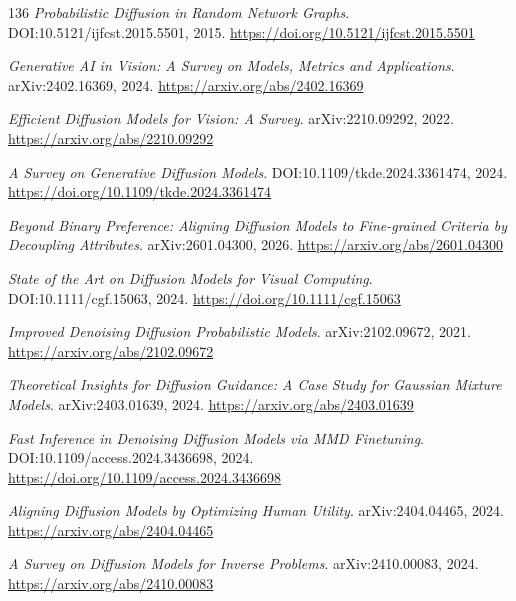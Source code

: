 \documentclass[11pt,a4paper]{article}
\begin{document}
\begin{thebibliography}{136}
\newblock \emph{Probabilistic Diffusion in Random Network Graphs}.
\newblock DOI:10.5121/ijfcst.2015.5501, 2015.
\newblock \url{https://doi.org/10.5121/ijfcst.2015.5501}

\newblock \emph{Generative AI in Vision: A Survey on Models, Metrics and Applications}.
\newblock arXiv:2402.16369, 2024.
\newblock \url{https://arxiv.org/abs/2402.16369}

\newblock \emph{Efficient Diffusion Models for Vision: A Survey}.
\newblock arXiv:2210.09292, 2022.
\newblock \url{https://arxiv.org/abs/2210.09292}

\newblock \emph{A Survey on Generative Diffusion Models}.
\newblock DOI:10.1109/tkde.2024.3361474, 2024.
\newblock \url{https://doi.org/10.1109/tkde.2024.3361474}

\newblock \emph{Beyond Binary Preference: Aligning Diffusion Models to Fine-grained Criteria by Decoupling Attributes}.
\newblock arXiv:2601.04300, 2026.
\newblock \url{https://arxiv.org/abs/2601.04300}

\newblock \emph{State of the Art on Diffusion Models for Visual Computing}.
\newblock DOI:10.1111/cgf.15063, 2024.
\newblock \url{https://doi.org/10.1111/cgf.15063}

\newblock \emph{Improved Denoising Diffusion Probabilistic Models}.
\newblock arXiv:2102.09672, 2021.
\newblock \url{https://arxiv.org/abs/2102.09672}

\newblock \emph{Theoretical Insights for Diffusion Guidance: A Case Study for Gaussian Mixture Models}.
\newblock arXiv:2403.01639, 2024.
\newblock \url{https://arxiv.org/abs/2403.01639}

\newblock \emph{Fast Inference in Denoising Diffusion Models via MMD Finetuning}.
\newblock DOI:10.1109/access.2024.3436698, 2024.
\newblock \url{https://doi.org/10.1109/access.2024.3436698}

\newblock \emph{Aligning Diffusion Models by Optimizing Human Utility}.
\newblock arXiv:2404.04465, 2024.
\newblock \url{https://arxiv.org/abs/2404.04465}

\newblock \emph{A Survey on Diffusion Models for Inverse Problems}.
\newblock arXiv:2410.00083, 2024.
\newblock \url{https://arxiv.org/abs/2410.00083}


\end{thebibliography}
\end{document}
